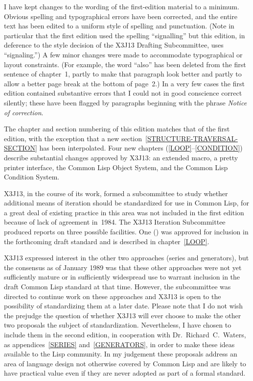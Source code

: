 I have kept changes to the wording of the first-edition material to a minimum.
Obvious spelling and typographical errors have been corrected,
and the entire text has been edited to a uniform style of
spelling and punctuation.  (Note in particular that the first edition
used the spelling ``signalling'' but this edition,
in deference to the style decision of the X3J13 Drafting
Subcommittee, uses ``signaling.'')  A few minor
changes were made to accommodate typographical or layout constraints.
(For example, the word ``also'' has been deleted from the first
sentence of chapter~1, partly to make that paragraph look better
and partly to allow a better page break at the bottom of page~2.)
In a very few cases the first edition contained substantive errors
that I could not in good conscience correct silently; these have
been flagged by paragraphs beginning with the phrase
\emph{Notice of correction}.

The chapter and section numbering of this edition matches that
of the first edition, with the exception that a new
section~\ref{STRUCTURE-TRAVERSAL-SECTION}
has been interpolated.
Four new chapters (\ref{LOOP}--\ref{CONDITION})
describe substantial changes approved by X3J13: an extended
 macro, a pretty printer interface, the Common Lisp
Object System, and the Common Lisp Condition System.

X3J13, in the course of its work, formed a subcommittee to study
whether additional means of iteration
should be standardized for use in Common Lisp, for a great
deal of existing practice in this area was not included in the
first edition because of lack of agreement in~1984.
The X3J13 Iteration Subcommittee produced reports on three possible facilities.
One () was approved for inclusion in the forthcoming draft standard
and is described in chapter~\ref{LOOP}.

X3J13 expressed interest in the other two approaches (series and generators),
but the consensus as of January 1989
was that these other approaches were not yet sufficiently mature or
in sufficiently widespread use to warrant inclusion in the draft Common Lisp
standard at that time.  However, the subcommittee was directed to continue work
on these approaches and X3J13 is open to the possibility of standardizing
them at a later date.
Please note that I do not wish the prejudge the
question of whether X3J13 will ever choose to make the other two proposals the
subject of standardization.  Nevertheless,
I have chosen to include them in the second edition,
in cooperation with Dr.~Richard~C.~Waters,
as appendices~\ref{SERIES} and~\ref{GENERATORS},
in order to make these ideas
available to the Lisp community.  In my judgement these proposals
address an area of language design not otherwise covered by Common Lisp
and are likely to have practical value even if they are never
adopted as part of a formal standard.

